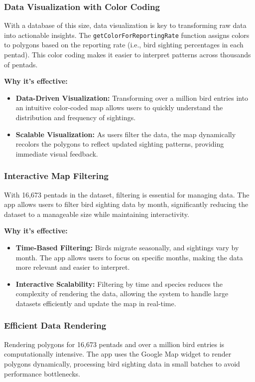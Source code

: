 \documentclass[a4paper]{article}
\begin{document}
\subsubsection{Data Visualization with Color Coding}
With a database of this size, data visualization is key to transforming raw data into actionable insights. The \texttt{getColorForReportingRate} function assigns colors to polygons based on the reporting rate (i.e., bird sighting percentages in each pentad). This color coding makes it easier to interpret patterns across thousands of pentads.

\textbf{Why it's effective:}
\begin{itemize}
    \item \textbf{Data-Driven Visualization:} Transforming over a million bird entries into an intuitive color-coded map allows users to quickly understand the distribution and frequency of sightings.
    \item \textbf{Scalable Visualization:} As users filter the data, the map dynamically recolors the polygons to reflect updated sighting patterns, providing immediate visual feedback.
\end{itemize}

\subsubsection{Interactive Map Filtering}
With 16,673 pentads in the dataset, filtering is essential for managing data. The app allows users to filter bird sighting data by month, significantly reducing the dataset to a manageable size while maintaining interactivity.

\textbf{Why it's effective:}
\begin{itemize}
    \item \textbf{Time-Based Filtering:} Birds migrate seasonally, and sightings vary by month. The app allows users to focus on specific months, making the data more relevant and easier to interpret.
    \item \textbf{Interactive Scalability:} Filtering by time and species reduces the complexity of rendering the data, allowing the system to handle large datasets efficiently and update the map in real-time.
\end{itemize}

\subsubsection{Efficient Data Rendering}
Rendering polygons for 16,673 pentads and over a million bird entries is computationally intensive. The app uses the Google Map widget to render polygons dynamically, processing bird sighting data in small batches to avoid performance bottlenecks.
\end{document}
